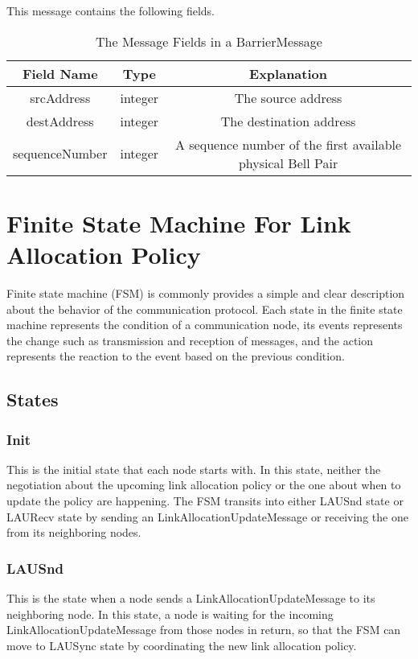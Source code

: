 This message contains the following fields.

\begin{table}[ht]
  \begin{center}
    \begin{tabular}{|c|c|c|} \hline
      Field Name & Type & Explanation \\ \hline \cline{1-3}
      srcAddress & integer & The source address \\ \cline{1-3}
      destAddress & integer & The destination address \\ \cline{1-3}
      sequenceNumber & integer & A sequence number of the first available physical Bell Pair \\ \cline{1-3}
    \end{tabular}
    \caption{The Message Fields in a BarrierMessage}
  \end{center}
\end{table}

\newpage

\section{Finite State Machine For Link Allocation Policy}

Finite state machine (FSM) is commonly provides a simple and clear description about the behavior of the communication protocol\cite{BOCHMANN1978361}.
Each state in the finite state machine represents the condition of a communication node, its events represents the change such as transmission and reception of messages, and the action represents the reaction to the event based on the previous condition.

\subsection{States}

\subsubsection{Init}
This is the initial state that each node starts with.  
In this state, neither the negotiation about the upcoming link allocation policy or the one about when to update the policy are happening.
The FSM transits into either LAUSnd state or LAURecv state by sending an LinkAllocationUpdateMessage or receiving the one from its neighboring nodes.

\subsubsection{LAUSnd}
This is the state when a node sends a LinkAllocationUpdateMessage to its neighboring node. 
In this state, a node is waiting for the incoming LinkAllocationUpdateMessage from those nodes in return, 
so that the FSM can move to LAUSync state by coordinating the new link allocation policy.

